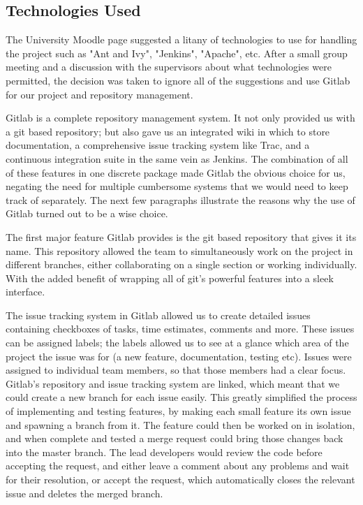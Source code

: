 \documentclass{l3proj}
\begin{document}
\subsection{Technologies Used}
\label{sec:tech}

The University Moodle page suggested a litany of technologies to use for handling the project such as "Ant and Ivy", "Jenkins", "Apache", etc. After a small group meeting and a discussion with the supervisors about what technologies were permitted, the decision was taken to ignore all of the suggestions and use Gitlab \cite{Gitlab} for our project and repository management.

Gitlab is a complete repository management system. It not only provided us with a git based repository; but also gave us an integrated wiki in which to store documentation, a comprehensive issue tracking system like Trac, and a continuous integration suite in the same vein as Jenkins. The combination of all of these features in one discrete package made Gitlab the obvious choice for us, negating the need for multiple cumbersome systems that we would need to keep track of separately. The next few paragraphs illustrate the reasons why the use of Gitlab turned out to be a wise choice.

The first major feature Gitlab provides is the git based repository that gives it its name. This repository allowed the team to simultaneously work on the project in different branches, either collaborating on a single section or working individually. With the added benefit of wrapping all of git's powerful features into a sleek interface.

The issue tracking system in Gitlab allowed us to create detailed issues containing checkboxes of tasks, time estimates, comments and more. These issues can be assigned labels; the labels allowed us to see at a glance which area of the project the issue was for (a new feature, documentation, testing etc). Issues were assigned to individual team members, so that those members had a clear focus. Gitlab's repository and issue tracking system are linked, which meant that we could create a new branch for each issue easily. This greatly simplified the process of implementing and testing features, by making each small feature its own issue and spawning a branch from it. The feature could then be worked on in isolation, and when complete and tested a merge request could bring those changes back into the master branch. The lead developers would review the code before accepting the request, and either leave a comment about any problems and wait for their resolution, or accept the request, which automatically closes the relevant issue and deletes the merged branch.
\end{document}
